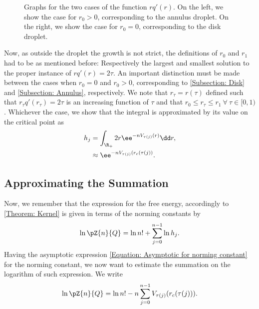 \begin{figure}[h!]
\begin{subfigure}[t]{0.45\textwidth}
	\end{subfigure}
	\caption{Graphs for the two cases of the function $rq'(r)$. On the left, we show the case for $r_0 > 0$, corresponding to the annulus droplet. On the right, we show the case for $r_0 = 0$, corresponding to the disk droplet.}
\end{figure}

Now, as outside the droplet the growth is not strict, the definitions of $r_0$ and $r_1$ had to be as mentioned before: Respectively the largest and smallest solution to the proper instance of $rq'(r) = 2\tau$. An important distinction must be made between the cases when $r_0 = 0$ and $r_0 > 0$, corresponding to \autoref{Subsection: Disk} and \autoref{Subsection: Annulus}, respectively.  We note that $r_\tau = r(\tau)$ defined such that $r_\tau q'(r_\tau) = 2 \tau$ is an increasing function of $\tau$ and that $r_0 \leq r_\tau \leq r_1 \ \forall \ \tau \in [0,1)$. Whichever the case, we show that the integral is approximated by its value on the critical point as
\begin{align}
	h_j & = \int_{\R_+} 2r \ee^{-n V_{\tau(j)}(r)} \dd r, \\
	&  \approx \ee^{-n V_{\tau(j)}(r_c(\tau(j))}.
	\label{Equation: Asymptotic for norming constant}
\end{align}

\subsection{Approximating the Summation}

Now, we remember that the expression for the free energy, accordingly to \autoref{Theorem: Kernel} is given in terms of the norming constants by
\begin{equation}
	\ln \pZ{n}{Q} = \ln{n!} + \sum_{j=0}^{n-1} \ln{h_j}.
\end{equation}
Having the asymptotic expression \eqref{Equation: Asymptotic for norming constant} for the norming constant, we now want to estimate the summation on the logarithm of such expression. We write
\begin{equation}
	\ln \pZ{n}{Q} = \ln{n!} - n \sum_{j=0}^{n-1} V_{\tau(j)}(r_c(\tau(j))).
\end{equation}

